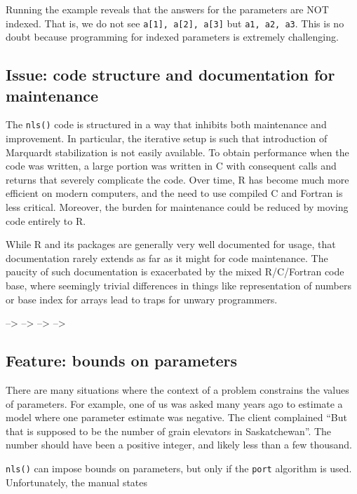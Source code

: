 \documentclass[
]{article}
\begin{document}
Running the example reveals that the answers for the parameters are NOT
indexed. That is, we do not see \texttt{a{[}1{]},\ a{[}2{]},\ a{[}3{]}}
but \texttt{a1,\ a2,\ a3}. This is no doubt because programming for
indexed parameters is extremely challenging.

\hypertarget{issue-code-structure-and-documentation-for-maintenance}{%
\subsection{Issue: code structure and documentation for
maintenance}\label{issue-code-structure-and-documentation-for-maintenance}}

The \texttt{nls()} code is structured in a way that inhibits both
maintenance and improvement. In particular, the iterative setup is such
that introduction of Marquardt stabilization is not easily available. To
obtain performance when the code was written, a large portion was
written in C with consequent calls and returns that severely complicate
the code. Over time, R has become much more efficient on modern
computers, and the need to use compiled C and Fortran is less critical.
Moreover, the burden for maintenance could be reduced by moving code
entirely to R.

While R and its packages are generally very well documented for usage,
that documentation rarely extends as far as it might for code
maintenance. The paucity of such documentation is exacerbated by the
mixed R/C/Fortran code base, where seemingly trivial differences in
things like representation of numbers or base index for arrays lead to
traps for unwary programmers.

--\textgreater{} --\textgreater{} --\textgreater{} --\textgreater{}

\hypertarget{feature-bounds-on-parameters}{%
\subsection{Feature: bounds on
parameters}\label{feature-bounds-on-parameters}}

There are many situations where the context of a problem constrains the
values of parameters. For example, one of us was asked many years ago to
estimate a model where one parameter estimate was negative. The client
complained ``But that is supposed to be the number of grain elevators in
Saskatchewan''. The number should have been a positive integer, and
likely less than a few thousand.

\texttt{nls()} can impose bounds on parameters, but only if the
\texttt{port} algorithm is used. Unfortunately, the manual states
\end{document}
